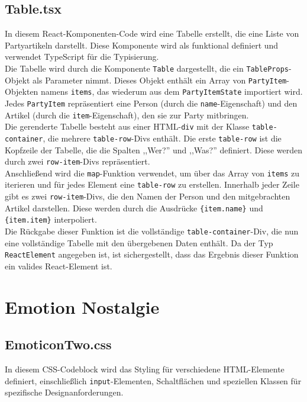 \documentclass[./dokumentation.tex]{subfiles}
\begin{document}
\subsection{Table.tsx}

In diesem React-Komponenten-Code wird eine Tabelle erstellt, die eine Liste von Partyartikeln darstellt. Diese Komponente wird als funktional definiert und verwendet TypeScript für die Typisierung.\\
Die Tabelle wird durch die Komponente \verb+Table+ dargestellt, die ein \verb+TableProps+-Objekt als Parameter nimmt. Dieses Objekt enthält ein Array von \verb+PartyItem+-Objekten namens \verb+items+, das wiederum aus dem \verb+PartyItemState+ importiert wird. Jedes \verb+PartyItem+ repräsentiert eine Person (durch die \verb+name+-Eigenschaft) und den Artikel (durch die \verb+item+-Eigenschaft), den sie zur Party mitbringen.\\
Die gerenderte Tabelle besteht aus einer HTML-\verb+div+ mit der Klasse \verb+table-container+, die mehrere \verb+table-row+-Divs enthält. Die erste \verb+table-row+ ist die Kopfzeile der Tabelle, die die Spalten ,,Wer?'' und ,,Was?'' definiert. Diese werden durch zwei \verb+row-item+-Divs repräsentiert.\\
Anschließend wird die \verb+map+-Funktion verwendet, um über das Array von \verb+items+ zu iterieren und für jedes Element eine \verb+table-row+ zu erstellen. Innerhalb jeder Zeile gibt es zwei \verb+row-item+-Divs, die den Namen der Person und den mitgebrachten Artikel darstellen. Diese werden durch die Ausdrücke \verb+{item.name}+ und \verb+{item.item}+ interpoliert.\\
Die Rückgabe dieser Funktion ist die vollständige \verb+table-container+-Div, die nun eine vollständige Tabelle mit den übergebenen Daten enthält. Da der Typ \verb+ReactElement+ angegeben ist, ist sichergestellt, dass das Ergebnis dieser Funktion ein valides React-Element ist.

\section{Emotion Nostalgie}
\subsection{EmoticonTwo.css}
In diesem CSS-Codeblock wird das Styling für verschiedene HTML-Elemente definiert, einschließlich \verb+input+-Elementen, Schaltflächen und speziellen Klassen für spezifische Designanforderungen.\\
\end{document}
